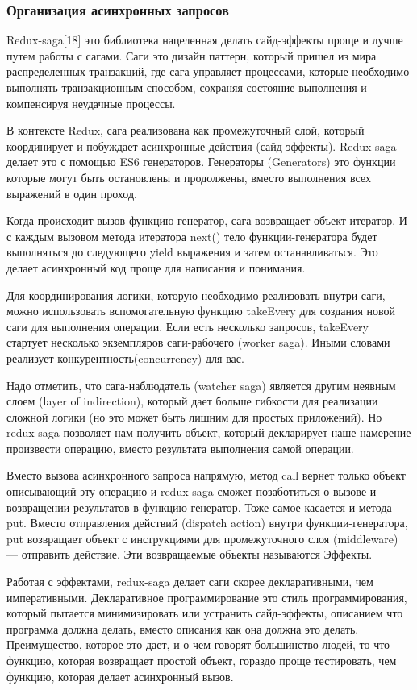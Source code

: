 \subsubsection{Организация асинхронных запросов}

Redux-saga[18] это библиотека нацеленная делать сайд-эффекты проще и лучше путем работы с сагами.
Саги это дизайн паттерн, который пришел из мира распределенных транзакций, где сага управляет процессами, которые необходимо выполнять транзакционным способом, сохраняя состояние выполнения и компенсируя неудачные процессы.

В контексте Redux, сага реализована как промежуточный слой, который координирует и побуждает асинхронные действия (сайд-эффекты).
Redux-saga делает это с помощью ES6 генераторов.
Генераторы (Generators) это функции которые могут быть остановлены и продолжены, вместо выполнения всех выражений в один проход.

Когда происходит вызов функцию-генератор, сага возвращает объект-итератор.
И с каждым вызовом метода итератора next() тело функции-генератора будет выполняться до следующего yield выражения и затем останавливаться.
Это делает асинхронный код проще для написания и понимания.

Для координирования логики, которую необходимо реализовать внутри саги, можно использовать вспомогательную функцию takeEvery для создания новой саги для выполнения операции.
Если есть несколько запросов, takeEvery стартует несколько экземпляров саги-рабочего (worker saga).
Иными словами реализует конкурентность(concurrency) для вас.

Надо отметить, что сага-наблюдатель (watcher saga) является другим неявным слоем (layer of indirection), который дает больше гибкости для реализации сложной логики (но это может быть лишним для простых приложений).
Но redux-saga позволяет нам получить объект, который декларирует наше намерение произвести операцию, вместо результата выполнения самой операции.

Вместо вызова асинхронного запроса напрямую, метод call вернет только объект описывающий эту операцию и redux-saga сможет позаботиться о вызове и возвращении результатов в функцию-генератор.
Тоже самое касается и метода put.
Вместо отправления действий (dispatch action) внутри функции-генератора, put возвращает объект с инструкциями для промежуточного слоя (middleware) — отправить действие.
Эти возвращаемые объекты называются Эффекты.

Работая с эффектами, redux-saga делает саги скорее декларативными, чем императивными.
Декларативное программирование это стиль программирования, который пытается минимизировать или устранить сайд-эффекты, описанием что программа должна делать, вместо описания как она должна это делать.
Преимущество, которое это дает, и о чем говорят большинство людей, то что функцию, которая возвращает простой объект, гораздо проще тестировать, чем функцию, которая делает асинхронный вызов.
